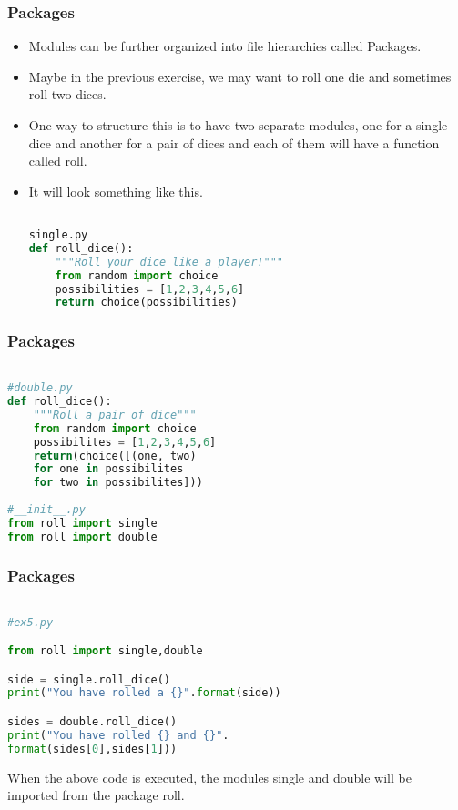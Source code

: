 \documentclass{beamer}
\begin{document}
\begin{frame}[fragile]
\frametitle{Packages}
\begin{itemize}
\item Modules can be further organized into file hierarchies called Packages.
\item Maybe in the previous exercise, we may want to roll one die and sometimes roll two dices.
\item One way to structure this is to have two separate modules, one for a single dice and another for a pair of dices and each of them will have a function called roll.
\item It will look something like this. 
\begin{lstlisting}[language=Python]

single.py
def roll_dice():
	"""Roll your dice like a player!"""
	from random import choice
	possibilities = [1,2,3,4,5,6]
	return choice(possibilities)
\end{lstlisting}

\end{itemize}
\end{frame}

\begin{frame}[fragile]
\frametitle{Packages}
 
\begin{lstlisting}[language=Python]

#double.py
def roll_dice():
	"""Roll a pair of dice"""
	from random import choice
	possibilites = [1,2,3,4,5,6]
	return(choice([(one, two) 
	for one in possibilites 
	for two in possibilites]))
	
#__init__.py
from roll import single
from roll import double

\end{lstlisting}

\end{frame}

\begin{frame}[fragile]
\frametitle{Packages}
 
\begin{lstlisting}[language=Python]

#ex5.py

from roll import single,double

side = single.roll_dice()
print("You have rolled a {}".format(side))

sides = double.roll_dice()
print("You have rolled {} and {}".
format(sides[0],sides[1]))
\end{lstlisting}

When the above code is executed, the modules single and double will be imported from the package roll.	

\end{frame}
\end{document}
